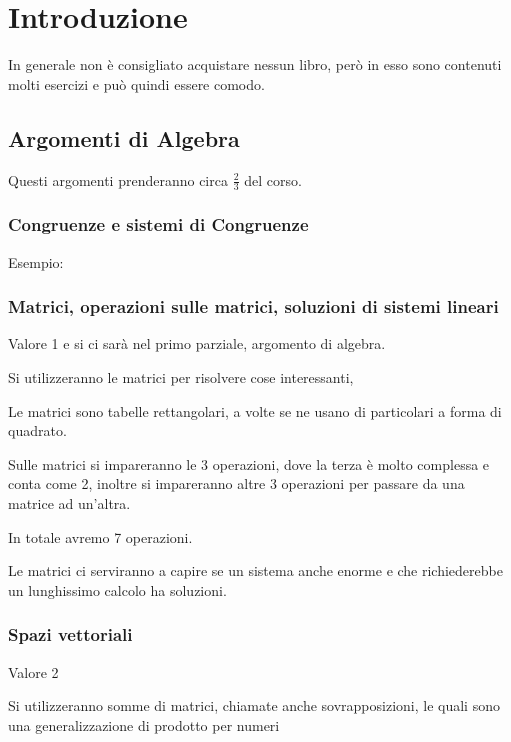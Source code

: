 \chapter{Introduzione}

In generale non è consigliato acquistare nessun libro, però in esso sono contenuti molti esercizi e può quindi essere comodo.

\section{Argomenti di Algebra}

Questi argomenti prenderanno circa $\frac{2}{3}$ del corso.

\subsection{Congruenze e sistemi di Congruenze}
Esempio:

\subsection{Matrici, operazioni sulle matrici, soluzioni di sistemi lineari}



Valore 1 e si ci sarà nel primo parziale, argomento di algebra.



Si utilizzeranno le matrici per risolvere cose interessanti,

Le matrici sono tabelle rettangolari, a volte se ne usano di particolari a forma di quadrato.

Sulle matrici si impareranno le 3 operazioni, dove la terza è molto complessa e conta come 2, inoltre si impareranno altre 3 operazioni per passare da una matrice ad un'altra. 

In totale avremo 7 operazioni.

Le matrici ci serviranno a capire se un sistema anche enorme e che richiederebbe un lunghissimo calcolo ha soluzioni.

\subsection{Spazi vettoriali}

Valore 2

Si utilizzeranno somme di matrici, chiamate anche sovrapposizioni, le quali sono una generalizzazione di prodotto per numeri %


